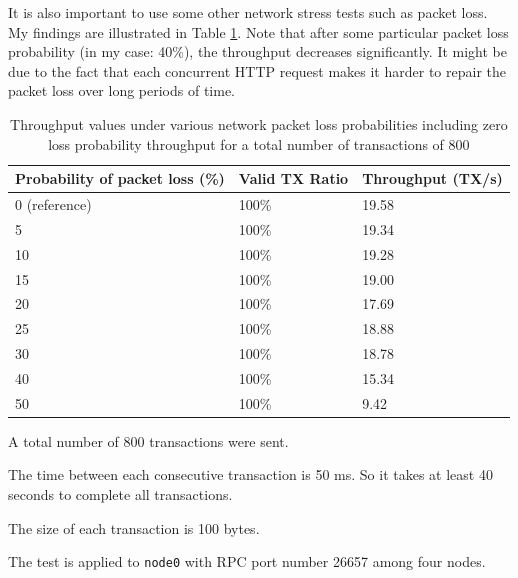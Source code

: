 \documentclass{article}
\begin{document}
It is also important to use some other network stress tests such as packet loss. My findings are illustrated in Table \ref{tab:Network packet loss throughput for larger time duration}. Note that after some particular packet loss probability (in my case: 40\%), the throughput decreases significantly. It might be due to the fact that each concurrent HTTP request makes it harder to repair the packet loss over long periods of time.

\begin{table}[ht]
    \begin{threeparttable}
        \centering
        \caption{Throughput values under various network packet loss probabilities including zero loss probability throughput for a total number of transactions of 800}
        \begin{tabular}{|l|l|l|}
        \hline
        \textbf{Probability of packet loss (\%)} & \textbf{Valid TX Ratio} & \textbf{Throughput (TX/s)} \\ \hline
        0 (reference)             & 100\%                   & 19.58                       \\ \hline
        5                         & 100\%                   & 19.34                        \\ \hline
        10                        & 100\%                   & 19.28                       \\ \hline
        15                        & 100\%                   & 19.00                       \\ \hline
        20                        & 100\%                   & 17.69                       \\ \hline
        25                        & 100\%                   & 18.88                       \\ \hline
        30                        & 100\%                   & 18.78                        \\ \hline
        40                        & 100\%                   & 15.34                       \\ \hline
        50                        & 100\%                   & 9.42                       \\ \hline
        \end{tabular}
        \label{tab:Network packet loss throughput for larger time duration}
        \begin{tablenotes}
            \item[1] A total number of 800 transactions were sent.
            \item[2] The time between each consecutive transaction is 50 ms. So it takes at least 40 seconds to complete all transactions.
            \item[3] The size of each transaction is 100 bytes.
            \item[4] The test is applied to \texttt{node0} with RPC port number 26657 among four nodes.
        \end{tablenotes}
    \end{threeparttable}
\end{table}
\end{document}
